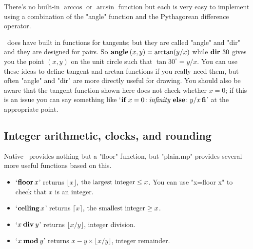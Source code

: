 \documentclass[a4paper,landscape]{article}
\def\kw#1{\begingroup\def\_{\kern.04em
    \vbox{\hrule width.3em height .6pt}\kern.08em}%
\ifmmode\mathop{\textbf{#1}}\else\hbox{\bf#1\/}\fi\endgroup}
\def\id#1{\begingroup\def\_{\kern.04em
    \vbox{\hrule width.3em height .6pt}\kern.08em}%
\ifmmode\mathop{\textit{#1}}\else\hbox{\it#1\/}\fi\endgroup}
\begin{document}
There's no built-in $\arccos$ or $\arcsin$ function but each is very easy to
implement using a combination of the "angle" function and the Pythagorean difference
operator.

\MP\ does have built in functions for tangents; but they are called "angle" and
"dir" and they are designed for pairs. So $\kw{angle}\,(x,y)=\arctan(y/x)$ while
$\kw{dir}\,30$ gives you the point $(x,y)$ on the unit circle such that $\tan
30^{\circ} = y/x$.  You can use these ideas to define tangent and arctan functions
if you really need them, but often "angle" and "dir" are more directly useful
for drawing.  You should also be aware that the tangent function shown here does not
check whether $x=0$; if this is an issue you can say something like
`$\kw{if}\,x=0\!:\id{infinity}\: \kw{else}\!: y/x \kw{fi}$' at the appropriate
point.

\newpage
\subsection{Integer arithmetic, clocks, and rounding}

Native \MP\ provides nothing but a "floor" function, but "plain.mp" provides several
more useful functions based on this.
\begin{itemize}
      \item `$\mathop{\kw{floor}} x$' returns $\lfloor x\rfloor$, $\hbox{the
          largest integer} \le x$.  You can use "x=floor x" to check that $x$ is an
          integer.
    \item `$\mathop{\kw{ceiling}} x$' returns $\lceil  x\rceil$,  $\hbox{the
        smallest integer} \ge x$.

    \item `$x \mathbin{\kw{div}} y$' returns          $\lfloor x/y \rfloor$, integer
        division.
    \item `$x \mathbin{\kw{mod}} y$' returns $x-y\times\lfloor x/y \rfloor$,
        integer remainder.
    
\end{itemize}
\end{document}
